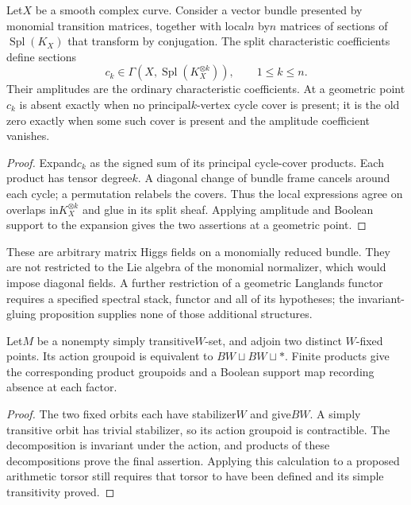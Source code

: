 \begin{proposition}\label{prop:matrix-higgs-support}
Let$X$ be a smooth complex curve. Consider a vector bundle presented by
monomial transition matrices, together with local$n$ by$n$ matrices of
sections of$\operatorname{Spl}(K_X)$ that transform by conjugation.
The split characteristic coefficients define sections
\[
 c_k\in\Gamma(X,\operatorname{Spl}(K_X^{\otimes k})),
 \qquad1\le k\le n.
\]
Their amplitudes are the ordinary characteristic coefficients. At a
geometric point$c_k$ is absent exactly when no principal$k$-vertex cycle
cover is present; it is the old zero exactly when some such cover is
present and the amplitude coefficient vanishes.
\end{proposition}
\begin{proof}
Expand$c_k$ as the signed sum of its principal cycle-cover products. Each
product has tensor degree$k$. A diagonal change of bundle frame cancels
around each cycle; a permutation relabels the covers. Thus the local
expressions agree on overlaps in$K_X^{\otimes k}$ and glue in its split
sheaf. Applying amplitude and Boolean support to the expansion gives the
two assertions at a geometric point.
\end{proof}

These are arbitrary matrix Higgs fields on a monomially reduced bundle.
They are not restricted to the Lie algebra of the monomial normalizer,
which would impose diagonal fields. A further restriction of a geometric
Langlands functor requires a specified spectral stack, functor and all of
its hypotheses; the invariant-gluing proposition supplies none of those
additional structures.

\begin{proposition}\label{prop:split-torsor}
Let$M$ be a nonempty simply transitive$W$-set, and adjoin two distinct
$W$-fixed points. Its action groupoid is equivalent to
$BW\sqcup BW\sqcup *$. Finite products give the corresponding product
groupoids and a Boolean support map recording absence at each factor.
\end{proposition}
\begin{proof}
The two fixed orbits each have stabilizer$W$ and give$BW$. A simply
transitive orbit has trivial stabilizer, so its action groupoid is
contractible. The decomposition is invariant under the action, and
products of these decompositions prove the final assertion. Applying this
calculation to a proposed arithmetic torsor still requires that torsor to
have been defined and its simple transitivity proved.
\end{proof}
